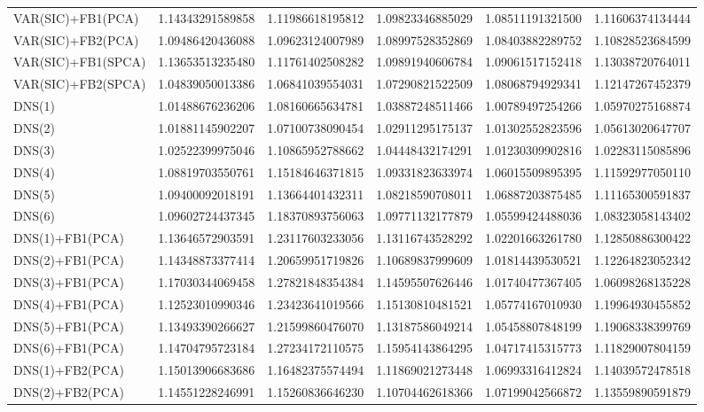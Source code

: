 \begin{table}[h]
\begin{adjustbox}{totalheight=\baselineskip}
\begin{tabular}{lSSSSS}
VAR(SIC)+FB1(PCA) & 1.14343291589858 & 1.11986618195812 & 1.09823346885029 & 1.08511191321500 & 1.11606374134444 \\ 
VAR(SIC)+FB2(PCA) & 1.09486420436088 & 1.09623124007989 & 1.08997528352869 & 1.08403882289752 & 1.10828523684599 \\ 
VAR(SIC)+FB1(SPCA) & 1.13653513235480 & 1.11761402508282 & 1.09891940606784 & 1.09061517152418 & 1.13038720764011 \\ 
VAR(SIC)+FB2(SPCA) & 1.04839050013386 & 1.06841039554031 & 1.07290821522509 & 1.08068794929341 & 1.12147267452379 \\ 
DNS(1) & 1.01488676236206 & 1.08160665634781 & 1.03887248511466 & 1.00789497254266 & 1.05970275168874 \\ 
DNS(2) & 1.01881145902207 & 1.07100738090454 & 1.02911295175137 & 1.01302552823596 & 1.05613020647707 \\ 
DNS(3) & 1.02522399975046 & 1.10865952788662 & 1.04448432174291 & 1.01230309902816 & 1.02283115085896 \\ 
DNS(4) & 1.08819703550761 & 1.15184646371815 & 1.09331823633974 & 1.06015509895395 & 1.11592977050110 \\ 
DNS(5) & 1.09400092018191 & 1.13664401432311 & 1.08218590708011 & 1.06887203875485 & 1.11165300591837 \\ 
DNS(6) & 1.09602724437345 & 1.18370893756063 & 1.09771132177879 & 1.05599424488036 & 1.08323058143402 \\ 
DNS(1)+FB1(PCA) & 1.13646572903591 & 1.23117603233056 & 1.13116743528292 & 1.02201663261780 & 1.12850886300422 \\ 
DNS(2)+FB1(PCA) & 1.14348873377414 & 1.20659951719826 & 1.10689837999609 & 1.01814439530521 & 1.12264823052342 \\ 
DNS(3)+FB1(PCA) & 1.17030344069458 & 1.27821848354384 & 1.14595507626446 & 1.01740477367405 & 1.06098268135228 \\ 
DNS(4)+FB1(PCA) & 1.12523010990346 & 1.23423641019566 & 1.15130810481521 & 1.05774167010930 & 1.19964930455852 \\ 
DNS(5)+FB1(PCA) & 1.13493390266627 & 1.21599860476070 & 1.13187586049214 & 1.05458807848199 & 1.19068338399769 \\ 
DNS(6)+FB1(PCA) & 1.14704795723184 & 1.27234172110575 & 1.15954143864295 & 1.04717415315773 & 1.11829007804159 \\ 
DNS(1)+FB2(PCA) & 1.15013906683686 & 1.16482375574494 & 1.11869021273448 & 1.06993316412824 & 1.14039572478518 \\ 
DNS(2)+FB2(PCA) & 1.14551228246991 & 1.15260836646230 & 1.10704462618366 & 1.07199042566872 & 1.13559890591879 \\ 

\end{tabular}
\end{adjustbox}
\end{table}

